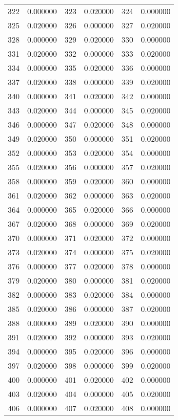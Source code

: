 \documentclass[12pt]{article}
\begin{document}
\begin{longtable}{@{}cc|cc|cc@{}}
322 & 0.000000 & 323 & 0.020000 & 324 & 0.000000 \\
325 & 0.020000 & 326 & 0.000000 & 327 & 0.020000 \\
328 & 0.000000 & 329 & 0.020000 & 330 & 0.000000 \\
331 & 0.020000 & 332 & 0.000000 & 333 & 0.020000 \\
334 & 0.000000 & 335 & 0.020000 & 336 & 0.000000 \\
337 & 0.020000 & 338 & 0.000000 & 339 & 0.020000 \\
340 & 0.000000 & 341 & 0.020000 & 342 & 0.000000 \\
343 & 0.020000 & 344 & 0.000000 & 345 & 0.020000 \\
346 & 0.000000 & 347 & 0.020000 & 348 & 0.000000 \\
349 & 0.020000 & 350 & 0.000000 & 351 & 0.020000 \\
352 & 0.000000 & 353 & 0.020000 & 354 & 0.000000 \\
355 & 0.020000 & 356 & 0.000000 & 357 & 0.020000 \\
358 & 0.000000 & 359 & 0.020000 & 360 & 0.000000 \\
361 & 0.020000 & 362 & 0.000000 & 363 & 0.020000 \\
364 & 0.000000 & 365 & 0.020000 & 366 & 0.000000 \\
367 & 0.020000 & 368 & 0.000000 & 369 & 0.020000 \\
370 & 0.000000 & 371 & 0.020000 & 372 & 0.000000 \\
373 & 0.020000 & 374 & 0.000000 & 375 & 0.020000 \\
376 & 0.000000 & 377 & 0.020000 & 378 & 0.000000 \\
379 & 0.020000 & 380 & 0.000000 & 381 & 0.020000 \\
382 & 0.000000 & 383 & 0.020000 & 384 & 0.000000 \\
385 & 0.020000 & 386 & 0.000000 & 387 & 0.020000 \\
388 & 0.000000 & 389 & 0.020000 & 390 & 0.000000 \\
391 & 0.020000 & 392 & 0.000000 & 393 & 0.020000 \\
394 & 0.000000 & 395 & 0.020000 & 396 & 0.000000 \\
397 & 0.020000 & 398 & 0.000000 & 399 & 0.020000 \\
400 & 0.000000 & 401 & 0.020000 & 402 & 0.000000 \\
403 & 0.020000 & 404 & 0.000000 & 405 & 0.020000 \\
406 & 0.000000 & 407 & 0.020000 & 408 & 0.000000 \\

\end{longtable}
\end{document}
